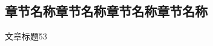 \documentclass[color=COLORFUL]{textbook-cn}%
\begin{document}
\begin{Appendix}
\Remark{\lipsum[2]}

\clearpage




\printindex[video]

\chapter*{章节名称章节名称章节名称章节名称}
\lipsum\lipsum



\newcommand{\wx}{\underline{~~\small\thewxcounter\refstepcounter{wxcounter}~~}}

\begin{Reading}{文章标题}{5}{3}
\lipsum[2]
\end{Reading}




\end{Appendix}
\end{document}
